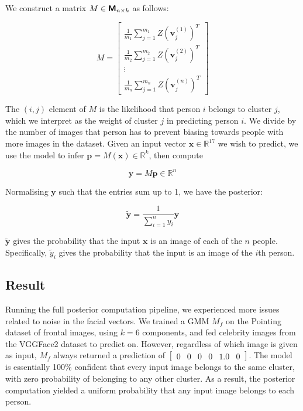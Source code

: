 \documentclass{article}
\begin{document}
We construct a matrix $M \in \textsf{\textbf{M}}_{n \times k}$ as follows:

\[M = \begin{bmatrix}
  \frac{1}{m_1} \sum_{j=1}^{m_1} Z(\mathbf{v}_j^{(1)})^T \\
  \frac{1}{m_2} \sum_{j=1}^{m_2} Z(\mathbf{v}_j^{(2)})^T \\
  \vdots \\
  \frac{1}{m_n} \sum_{j=1}^{m_n} Z(\mathbf{v}_j^{(n)})^T
\end{bmatrix}\]

The $(i, j)$ element of $M$ is the likelihood that person $i$ belongs to cluster
$j$, which we interpret as the weight of cluster $j$ in predicting person $i$.
We divide by the number of images that person has to prevent biasing towards
people with more images in the dataset. Given an input vector $\mathbf{x} \in
\mathbb{R}^{17}$ we wish to predict, we use the model to infer $\mathbf{p} =
M(\mathbf{x}) \in \mathbb{R}^k$, then compute

\[\mathbf{y} = M\mathbf{p} \in \mathbb{R}^n\]

Normalising $\mathbf{y}$ such that the entries sum up to 1, we have the
posterior:

\[\tilde{\mathbf{y}} = \frac{1}{\sum_{i=1}^n y_i} \mathbf{y}\]

$\tilde{\mathbf{y}}$ gives the probability that the input $\mathbf{x}$ is an
image of each of the $n$ people. Specifically, $\tilde{y}_i$ gives the
probability that the input is an image of the $i$th person.

\subsection{Result}

Running the full posterior computation pipeline, we experienced more issues
related to noise in the facial vectors. We trained a GMM $M_f$ on the Pointing
dataset of frontal images, using $k = 6$ components, and fed celebrity images
from the VGGFace2 dataset to predict on. However, regardless of which image is
given as input, $M_f$ always returned a prediction of $\begin{bmatrix} 0 & 0 & 0
& 0 & 1.0 & 0 \end{bmatrix}$. The model is essentially 100\% confident that
every input image belongs to the same cluster, with zero probability of
belonging to any other cluster. As a result, the posterior computation yielded a
uniform probability that any input image belongs to each person.
\end{document}
